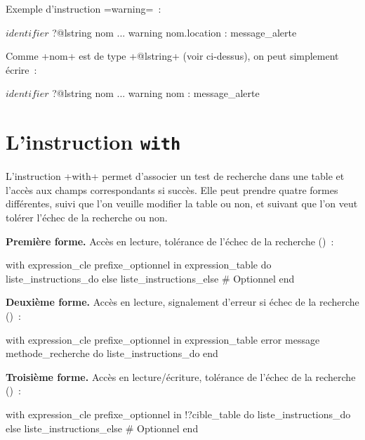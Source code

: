 Exemple d'instruction \ggs=warning=~:

\begin{galgas}
$identifier$ ?@lstring nom
...
warning nom.location : message_alerte
\end{galgas}

Comme \ggs+nom+ est de type \ggs+@lstring+ (voir ci-dessus), on peut simplement écrire~:
\begin{galgas}
$identifier$ ?@lstring nom
...
warning nom : message_alerte
\end{galgas}










\section{L'instruction \texttt{with}}

L'instruction \ggs+with+ permet d'associer un test de recherche dans une table et l'accès aux champs correspondants si succès. Elle peut prendre quatre formes différentes, suivi que l'on veuille modifier la table ou non, et suivant que l'on veut tolérer l'échec de la recherche ou non.

\textbf{Première forme.} Accès en lecture, tolérance de l'échec de la recherche ()~:
\begin{galgas}
with expression_cle prefixe_optionnel in expression_table
do
  liste_instructions_do
else
  liste_instructions_else # Optionnel
end
\end{galgas}

\textbf{Deuxième forme.} Accès en lecture, signalement d'erreur si échec de la recherche ()~:
\begin{galgas}
with expression_cle prefixe_optionnel in expression_table
error message methode_recherche
do
  liste_instructions_do
end
\end{galgas}



\textbf{Troisième forme.} Accès en lecture/écriture, tolérance de l'échec de la recherche ()~:
\begin{galgas}
with expression_cle prefixe_optionnel in !?cible_table
do
  liste_instructions_do
else
  liste_instructions_else # Optionnel
end
\end{galgas}


